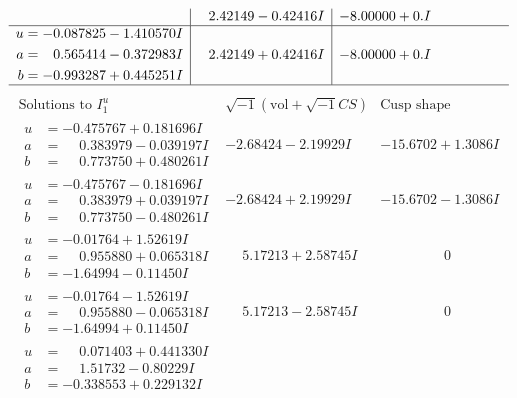 \documentclass[1p]{elsarticle_modified}
\theoremstyle{definition}
\newcommand{\I}{\sqrt{-1}}
\begin{document}
$$\begin{array}{c|c|c}
 & \phantom{-}2.42149 - 0.42416 I & -8.00000 + 0. I\phantom{ +0.000000I} \\ \hline\begin{aligned}
u &= -0.087825 - 1.410570 I \\
a &= \phantom{-}0.565414 - 0.372983 I \\
b &= -0.993287 + 0.445251 I\end{aligned}
 & \phantom{-}2.42149 + 0.42416 I & -8.00000 + 0. I\phantom{ +0.000000I}\\
 \hline 
 \end{array}$$\newpage$$\begin{array}{c|c|c}  
\text{Solutions to }I^u_{1}& \I (\text{vol} + \sqrt{-1}CS) & \text{Cusp shape}\\
 \hline 
\begin{aligned}
u &= -0.475767 + 0.181696 I \\
a &= \phantom{-}0.383979 - 0.039197 I \\
b &= \phantom{-}0.773750 + 0.480261 I\end{aligned}
 & -2.68424 - 2.19929 I & -15.6702 + 1.3086 I \\ \hline\begin{aligned}
u &= -0.475767 - 0.181696 I \\
a &= \phantom{-}0.383979 + 0.039197 I \\
b &= \phantom{-}0.773750 - 0.480261 I\end{aligned}
 & -2.68424 + 2.19929 I & -15.6702 - 1.3086 I \\ \hline\begin{aligned}
u &= -0.01764 + 1.52619 I \\
a &= \phantom{-}0.955880 + 0.065318 I \\
b &= -1.64994 - 0.11450 I\end{aligned}
 & \phantom{-}5.17213 + 2.58745 I & \phantom{-0.000000 } 0 \\ \hline\begin{aligned}
u &= -0.01764 - 1.52619 I \\
a &= \phantom{-}0.955880 - 0.065318 I \\
b &= -1.64994 + 0.11450 I\end{aligned}
 & \phantom{-}5.17213 - 2.58745 I & \phantom{-0.000000 } 0 \\ \hline\begin{aligned}
u &= \phantom{-}0.071403 + 0.441330 I \\
a &= \phantom{-}1.51732 - 0.80229 I \\
b &= -0.338553 + 0.229132 I\end{aligned}

\end{array}$$
\end{document}
